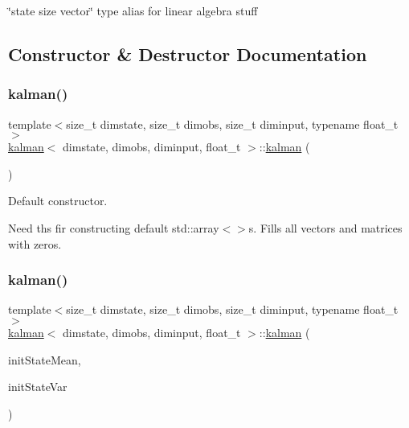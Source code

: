 \char`\"{}state size vector\char`\"{} type alias for linear algebra stuff 

\subsection{Constructor \& Destructor Documentation}
\mbox{\label{classkalman_a8b05d79f154bf5669457a3e95f7323d5}} 
\subsubsection{\texorpdfstring{kalman()}{kalman()}\hspace{0.1cm}{\footnotesize\ttfamily [1/2]}}
{\footnotesize\ttfamily template$<$size\+\_\+t dimstate, size\+\_\+t dimobs, size\+\_\+t diminput, typename float\+\_\+t $>$ \\
\hyperlink{classkalman}{kalman}$<$ dimstate, dimobs, diminput, float\+\_\+t $>$\+::\hyperlink{classkalman}{kalman} (\begin{DoxyParamCaption}{ }\end{DoxyParamCaption})}



Default constructor. 

Need ths fir constructing default std\+::array$<$$>$s. Fills all vectors and matrices with zeros. \mbox{\label{classkalman_a91ec8bcb52e26df651001d8f8e574373}} 
\subsubsection{\texorpdfstring{kalman()}{kalman()}\hspace{0.1cm}{\footnotesize\ttfamily [2/2]}}
{\footnotesize\ttfamily template$<$size\+\_\+t dimstate, size\+\_\+t dimobs, size\+\_\+t diminput, typename float\+\_\+t $>$ \\
\hyperlink{classkalman}{kalman}$<$ dimstate, dimobs, diminput, float\+\_\+t $>$\+::\hyperlink{classkalman}{kalman} (\begin{DoxyParamCaption}\item[{const \hyperlink{classkalman_a732cf05b5ddd106cfdafc324d03f756e}{ssv} \&}]{init\+State\+Mean,  }\item[{const \hyperlink{classkalman_a581550d9aba33245fb496b22a834831c}{ss\+Mat} \&}]{init\+State\+Var }\end{DoxyParamCaption})}



